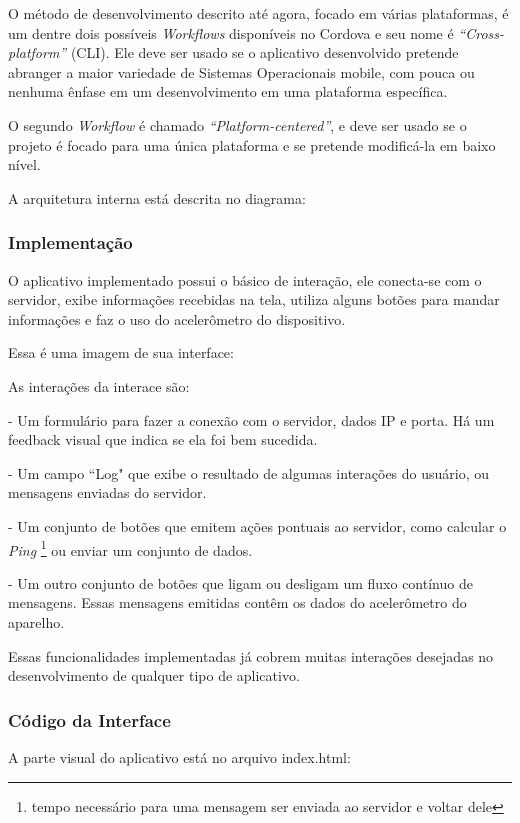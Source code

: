 \documentclass[a4paper,12pt]{article}
\begin{document}
O método de desenvolvimento descrito até agora, focado em várias plataformas, é um dentre dois possíveis \emph{Workflows} disponíveis no Cordova e seu nome é \emph{“Cross-platform”} (CLI). Ele deve ser usado se o aplicativo desenvolvido pretende abranger a maior variedade de Sistemas Operacionais mobile, com pouca ou nenhuma ênfase em um desenvolvimento em uma plataforma específica.

O segundo \emph{Workflow} é chamado \emph{“Platform-centered”}, e deve ser usado se o projeto é focado para uma única plataforma e se pretende modificá-la em baixo nível.

A arquitetura interna está descrita no diagrama:



\subsubsection{Implementação}

O aplicativo implementado possui o básico de interação, ele conecta-se com o servidor, exibe informações recebidas na tela, utiliza alguns botões para mandar informações e faz o uso do acelerômetro do dispositivo.

Essa é uma imagem de sua interface:


As interações da interace são: %

- Um formulário para fazer a conexão com o servidor, dados IP e porta. Há um feedback visual que indica se ela foi bem sucedida.

- Um campo “Log" que exibe o resultado de algumas interações do usuário, ou mensagens enviadas do servidor.

- Um conjunto de botões que emitem ações pontuais ao servidor, como calcular o \emph{Ping} \footnote{tempo necessário para uma mensagem ser enviada ao servidor e voltar dele} ou enviar um conjunto de dados.

- Um outro conjunto de botões que ligam ou desligam um fluxo contínuo de mensagens. Essas mensagens emitidas contêm os dados do acelerômetro do aparelho.

Essas funcionalidades implementadas já cobrem muitas interações desejadas no desenvolvimento de qualquer tipo de aplicativo.


\subsubsection{Código da Interface}
A parte visual do aplicativo está no arquivo index.html:
\end{document}
